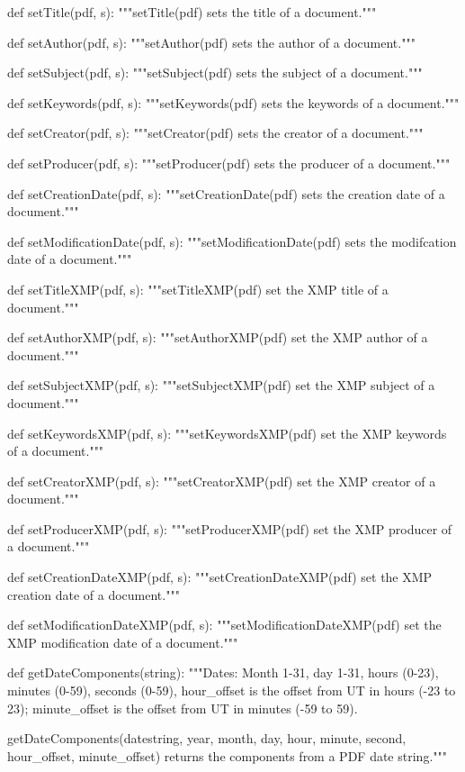 def setTitle(pdf, s):
    """setTitle(pdf) sets the title of a document."""

def setAuthor(pdf, s):
    """setAuthor(pdf) sets the author of a document."""

def setSubject(pdf, s):
    """setSubject(pdf) sets the subject of a document."""

def setKeywords(pdf, s):
    """setKeywords(pdf) sets the keywords of a document."""

def setCreator(pdf, s):
    """setCreator(pdf) sets the creator of a document."""

def setProducer(pdf, s):
    """setProducer(pdf) sets the producer of a document."""

def setCreationDate(pdf, s):
    """setCreationDate(pdf) sets the creation date of a document."""

def setModificationDate(pdf, s):
    """setModificationDate(pdf) sets the modifcation date of a document."""

def setTitleXMP(pdf, s):
    """setTitleXMP(pdf) set the XMP title of a document."""

def setAuthorXMP(pdf, s):
    """setAuthorXMP(pdf) set the XMP author of a document."""

def setSubjectXMP(pdf, s):
    """setSubjectXMP(pdf) set the XMP subject of a document."""

def setKeywordsXMP(pdf, s):
    """setKeywordsXMP(pdf) set the XMP keywords of a document."""

def setCreatorXMP(pdf, s):
    """setCreatorXMP(pdf) set the XMP creator of a document."""

def setProducerXMP(pdf, s):
    """setProducerXMP(pdf) set the XMP producer of a document."""

def setCreationDateXMP(pdf, s):
    """setCreationDateXMP(pdf) set the XMP creation date of a document."""

def setModificationDateXMP(pdf, s):
    """setModificationDateXMP(pdf) set the XMP modification date of a
    document."""

def getDateComponents(string):
    """Dates: Month 1-31, day 1-31, hours (0-23), minutes (0-59), seconds
    (0-59), hour_offset is the offset from UT in hours (-23 to 23);
    minute_offset is the offset from UT in minutes (-59 to 59).

    getDateComponents(datestring, year, month, day, hour, minute, second,
    hour_offset, minute_offset) returns the components from a PDF date
    string."""


